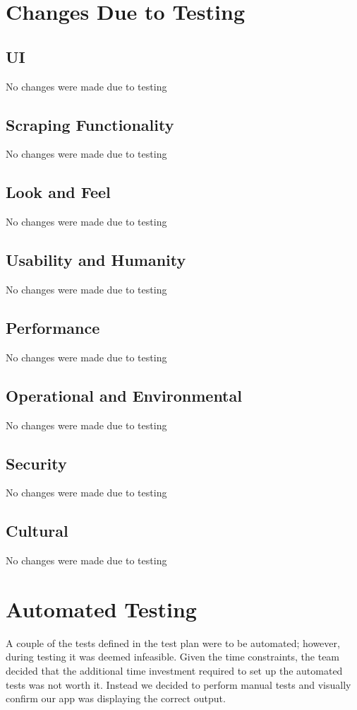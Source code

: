 \documentclass[12pt, titlepage]{article}
\begin{document}
\section{Changes Due to Testing}

\subsection{UI}
No changes were made due to testing
\subsection{Scraping Functionality}
No changes were made due to testing
\subsection{Look and Feel}
No changes were made due to testing
\subsection{Usability and Humanity}
No changes were made due to testing
\subsection{Performance}
No changes were made due to testing
\subsection{Operational and Environmental}
No changes were made due to testing
\subsection{Security}
No changes were made due to testing
\subsection{Cultural}
No changes were made due to testing

\section{Automated Testing}

A couple of the tests defined in the test plan were to be automated; however, during testing it was deemed infeasible. Given the time constraints, the team decided that the additional time investment required to set up the automated tests was not worth it. Instead we decided to perform manual tests and visually confirm our app was displaying the correct output. 
\end{document}
